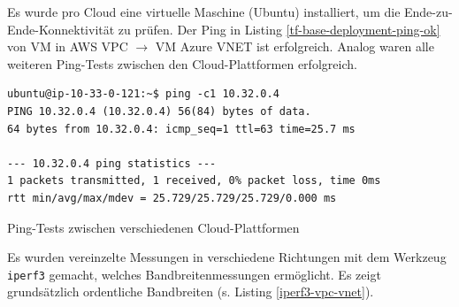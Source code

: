 Es wurde pro Cloud eine virtuelle Maschine (Ubuntu) installiert, um die Ende-zu-Ende-Konnektivität zu prüfen. Der Ping in Listing \ref{tf-base-deployment-ping-ok} von \gls{VM} in AWS \gls{VPC} $\rightarrow$ \gls{VM} Azure \gls{VNET} ist erfolgreich. Analog waren alle weiteren Ping-Tests zwischen den Cloud-Plattformen erfolgreich.
\begin{listing}[h]
\begin{verbatim}
ubuntu@ip-10-33-0-121:~$ ping -c1 10.32.0.4
PING 10.32.0.4 (10.32.0.4) 56(84) bytes of data.
64 bytes from 10.32.0.4: icmp_seq=1 ttl=63 time=25.7 ms

--- 10.32.0.4 ping statistics ---
1 packets transmitted, 1 received, 0% packet loss, time 0ms
rtt min/avg/max/mdev = 25.729/25.729/25.729/0.000 ms
\end{verbatim}
\caption{Ping-Tests zwischen verschiedenen Cloud-Plattformen}
\label{tf-base-deployment-ping-ok}
\end{listing}\FloatBarrier
Es wurden vereinzelte Messungen in verschiedene Richtungen mit dem Werkzeug \texttt{iperf3} gemacht, welches Bandbreitenmessungen ermöglicht. Es zeigt grundsätzlich \glqq ordentliche\grqq{} Bandbreiten (s. Listing \ref{iperf3-vpc-vnet}).

